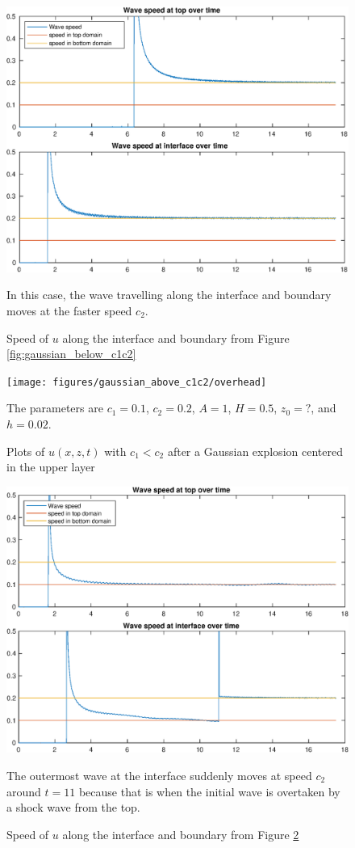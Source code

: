 \documentclass[11pt,letter,subeqn,fleqn]{article}
\numberwithin{equation}{section}
\numberwithin{table}{section}
\numberwithin{figure}{section}
\begin{document}
\begin{figure}[htbp]
	\caption{Speed of $u$ along the interface and boundary from Figure \ref{fig:gaussian_below_c1c2}}
	\label{fig:gaussian_below_c1c2_speed}
	\includegraphics[width=0.7\linewidth]{figures/gaussian_below_c1c2/wavespeeds}
\footnotesize
\centering

In this case, the wave travelling along the interface and boundary moves at the faster speed $c_2$.
\end{figure}


\begin{figure}[htbp]
	\caption{Plots of $u(x,z,t)$ with $c_1<c_2$ after a Gaussian explosion centered in the upper layer}
	\label{fig:gaussian_above_c1c2}
	\texttt{[image: figures/gaussian\_above\_c1c2/overhead]}
\footnotesize
\centering

The parameters are $c_1 = 0.1$, $c_2 = 0.2$, $A=1$, $H=0.5$, $z_0=?$, and $h = 0.02$.
\end{figure}

\begin{figure}[htbp]
	\caption{Speed of $u$ along the interface and boundary from Figure \ref{fig:gaussian_above_c1c2}}
	\label{fig:gaussian_above_c1c2_speed}
	\includegraphics[width=0.7\linewidth]{figures/gaussian_above_c1c2/wavespeeds}
\footnotesize
\centering

The outermost wave at the interface suddenly moves at speed $c_2$ around $t=11$ because that is when the initial wave is overtaken by a shock wave from the top.
\end{figure}
\end{document}

